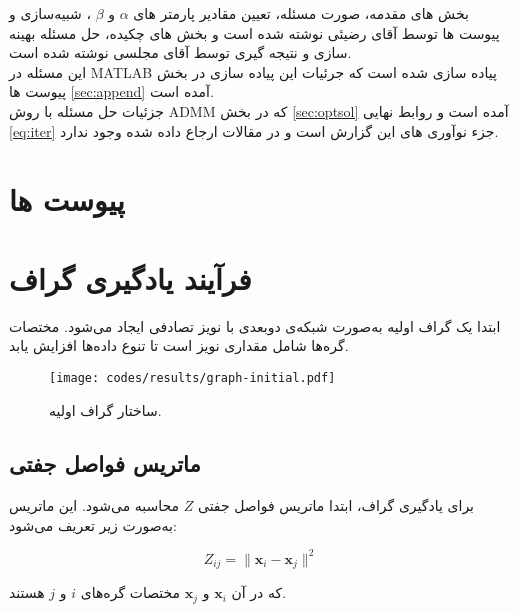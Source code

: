 \documentclass[10pt,twocolumn,a4paper]{article}
\begin{document}
	بخش های مقدمه، صورت مسئله، تعیین مقادیر پارمتر های 
	$\alpha$ و $\beta$
	، شبیه‌سازی و پیوست ها توسط آقای رضیئی نوشته شده است و بخش های چکیده، حل مسئله بهینه سازی و نتیجه گیری توسط آقای مجلسی نوشته شده است.\\
	
	این مسئله در MATLAB پیاده سازی شده است که جرئیات این پیاده سازی در  بخش پیوست ها
	\ref{sec:append}
	آمده است. \\
	
	جزئیات حل مسئله با روش ADMM که در بخش
	\ref{sec:optsol}
	آمده است و روابط نهایی 
	\ref{eq:iter}
	جزء نوآوری های این گزارش است و در مقالات ارجاع داده شده وجود ندارد.
	

	
	
	
	
	\nocite{*}
	
	
	
	\clearpage
	
	\section*{پیوست ها}\label{sec:append}
	\appendix
	
	\section{فرآیند یادگیری گراف}
	
	ابتدا یک گراف اولیه به‌صورت شبکه‌ی دوبعدی با نویز تصادفی ایجاد می‌شود. مختصات گره‌ها شامل مقداری نویز است تا تنوع داده‌ها افزایش یابد.
	
	\begin{latin}
		
	\end{latin}
	
	\begin{figure}[H]
		\centering
		\texttt{[image: codes/results/graph-initial.pdf]}
		\caption{ساختار گراف اولیه.}
		\label{fig:graph-initial}
	\end{figure}
	
	\subsection{ماتریس فواصل جفتی}
	برای یادگیری گراف، ابتدا ماتریس فواصل جفتی \( Z \) محاسبه می‌شود. این ماتریس به‌صورت زیر تعریف می‌شود:
	
	\[
	Z_{ij} = \|\mathbf{x}_i - \mathbf{x}_j\|^2
	\]
	
	که در آن \( \mathbf{x}_i \) و \( \mathbf{x}_j \) مختصات گره‌های \( i \) و \( j \) هستند.
	
\end{document}
